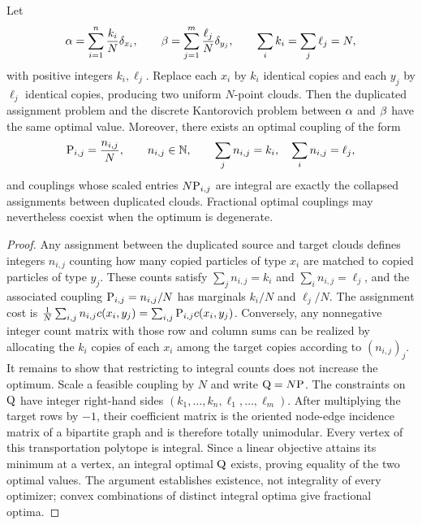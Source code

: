 \begin{proposition}\label{prop-rational-weights-duplicated-matching}
	Let
	\[
		\al=\sum_{i=1}^n \frac{k_i}{N}\delta_{x_i},
		\qquad
		\be=\sum_{j=1}^m \frac{\ell_j}{N}\delta_{y_j},
		\qquad
		\sum_i k_i=\sum_j\ell_j=N,
	\]
	with positive integers $k_i,\ell_j$. Replace each $x_i$ by $k_i$ identical copies and each $y_j$ by $\ell_j$ identical copies, producing two uniform $N$-point clouds. Then the duplicated assignment problem and the discrete Kantorovich problem between $\al$ and $\be$ have the same optimal value. Moreover, there exists an optimal coupling of the form
	\[
	\P_{i,j}=\frac{n_{i,j}}{N},
		\qquad
		n_{i,j}\in\NN,
		\qquad
		\sum_j n_{i,j}=k_i,
		\quad
		\sum_i n_{i,j}=\ell_j,
	\]
	and couplings whose scaled entries $N\P_{i,j}$ are integral are exactly the collapsed assignments between duplicated clouds. Fractional optimal couplings may nevertheless coexist when the optimum is degenerate.
\end{proposition}
\begin{proof}
Any assignment between the duplicated source and target clouds defines integers $n_{i,j}$ counting how many copied particles of type $x_i$ are matched to copied particles of type $y_j$. These counts satisfy $\sum_j n_{i,j}=k_i$ and $\sum_i n_{i,j}=\ell_j$, and the associated coupling $\P_{i,j}=n_{i,j}/N$ has marginals $k_i/N$ and $\ell_j/N$. The assignment cost is $\frac1N\sum_{i,j} n_{i,j}c(x_i,y_j)=\sum_{i,j}\P_{i,j}c(x_i,y_j)$.
	Conversely, any nonnegative integer count matrix with those row and column sums can be realized by allocating the $k_i$ copies of each $x_i$ among the target copies according to $(n_{i,j})_j$. It remains to show that restricting to integral counts does not increase the optimum. Scale a feasible coupling by $N$ and write $\Q=N\P$. The constraints on $\Q$ have integer right-hand sides $(k_1,\ldots,k_n,\ell_1,\ldots,\ell_m)$. After multiplying the target rows by $-1$, their coefficient matrix is the oriented node-edge incidence matrix of a bipartite graph and is therefore totally unimodular. Every vertex of this transportation polytope is integral. Since a linear objective attains its minimum at a vertex, an integral optimal $\Q$ exists, proving equality of the two optimal values. The argument establishes existence, not integrality of every optimizer; convex combinations of distinct integral optima give fractional optima.
\end{proof}

